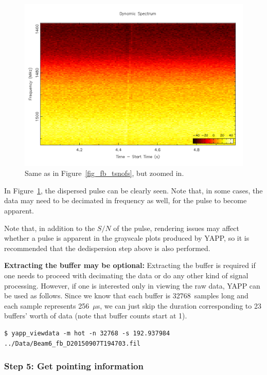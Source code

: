 \documentclass{article}
\begin{document}
\begin{figure}[h]
\includegraphics[width=\textwidth]{fb_tsnofs_zoomed.png}
\caption{Same as in Figure~\ref{fig_fb_tsnofs}, but zoomed in.
    \label{fig_fb_tsnofs_zoomed}}
\end{figure}

In Figure~\ref{fig_fb_tsnofs_zoomed}, the dispersed pulse can be clearly seen.
Note that, in some cases, the data may need to be decimated in frequency as
well, for the pulse to become apparent.

Note that, in addition to the $S/N$ of the pulse, rendering issues may affect
whether a pulse is apparent in the grayscale plots produced by YAPP, so it is
recommended that the dedispersion step above is also performed.

\textbf{Extracting the buffer may be optional:} Extracting the buffer is
required if one needs to proceed with decimating the data or do any other kind
of signal processing. However, if one is interested only in viewing the raw
data, YAPP can be used as follows. Since we know that each buffer is
32768~samples long and each sample represents 256~$\mu$s, we can just skip the
duration corresponding to 23 buffers' worth of data (note that buffer counts
start at 1).

\small{
\begin{verbatim}
$ yapp_viewdata -m hot -n 32768 -s 192.937984 ../Data/Beam6_fb_D20150907T194703.fil
\end{verbatim}
}

\subsubsection*{Step 5: Get pointing information}
\end{document}
